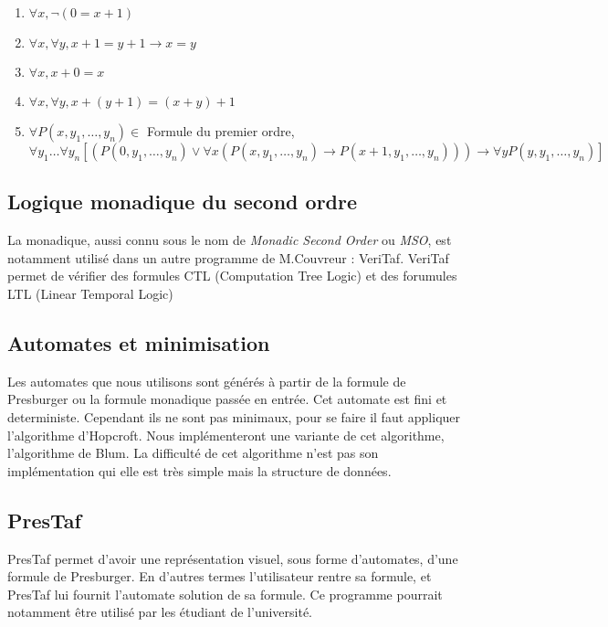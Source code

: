 \documentclass{article}%
\begin{document}
\begin{enumerate}
    \item $\forall x, \neg(0 = x + 1)$
    \item $\forall x, \forall y, x + 1 = y + 1 \rightarrow x = y $
    \item $\forall x, x + 0 = x$
    \item $\forall x, \forall y, x + (y + 1) = (x + y) + 1$
    \item $\forall P(x, y_1, \ldots, y_n) \in$ Formule du premier ordre, 
    $\forall y_1 \ldots \forall y_n [(P(0, y_1, \ldots,y_n) \vee \forall x(P(x, y_1, \ldots, y_n) \rightarrow P(x + 1, y_1, \ldots, y_n))) \rightarrow \forall y P(y, y_1, \ldots, y_n)]$
\end{enumerate}

\subsection{Logique monadique du second ordre}

La \gls{monadique}, aussi connu sous le nom de \emph{Monadic Second Order} ou \emph{MSO}, est notamment utilisé dans un autre programme de M.Couvreur : VeriTaf. VeriTaf permet de vérifier des formules CTL (Computation Tree Logic) et des forumules LTL (Linear Temporal Logic)

\subsection{Automates et minimisation}

Les automates que nous utilisons sont générés à partir de la formule de Presburger ou la formule monadique passée en entrée. Cet automate est fini et deterministe. Cependant ils ne sont pas minimaux, pour se faire il faut appliquer l'algorithme d'Hopcroft\cite{hopcroft1971n}. Nous implémenteront une variante de cet algorithme, l'algorithme de Blum\cite{blum1996nlogn}. La difficulté de cet algorithme n'est pas son implémentation qui elle est très simple mais la structure de données.

\subsection{PresTaf}

PresTaf permet d'avoir une représentation visuel, sous forme d'automates, d'une formule de Presburger. En d'autres termes l'utilisateur rentre sa formule, et PresTaf lui fournit l'automate solution de sa formule. Ce programme pourrait notamment être utilisé par les étudiant de l'université.
\end{document}
